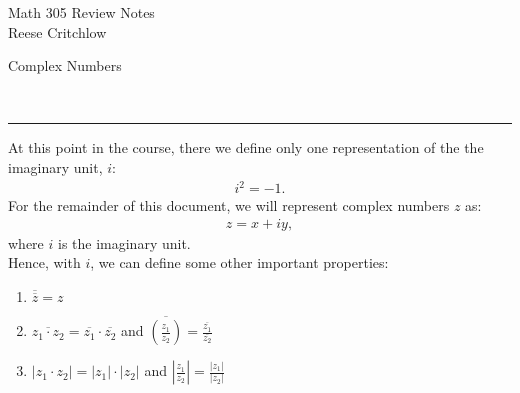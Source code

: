 \documentclass{article}
\newcommand{\header}[1]{\begin{large}\noindent #1\end{large}\\\rule{\textwidth}{0.5pt}}
\newcommand{\gap}{\medskip\\}
\newcommand{\ds}{\displaystyle}
\begin{document}
    \begin{center}
        \Large Math 305 Review Notes\\
        \normalsize Reese Critchlow
    \end{center}

    \header{Complex Numbers}

    At this point in the course, there we define only one representation of the 
    the imaginary unit, $i$:
    \begin{align*}
        i^2 = -1.
    \end{align*}
    For the remainder of this document, we will represent complex numbers $z$ as:
    \begin{align*}
        z = x + iy,
    \end{align*}
    where $i$ is the imaginary unit.
    \gap
    Hence, with $i$, we can define some other important properties:
    \begin{enumerate}
        \item $\ds \overline{\overline{z}} = z$
        \item $\ds \overline{z_1 \cdot z_2} = \overline{z_1}\cdot \overline{z_2}$ and
        $\ds \overline{\left(\frac{z_1}{z_2}\right)} = \frac{\overline{z_1}}{\overline{z_2}}$
        \item $\ds |z_1 \cdot z_2 | = |z_1| \cdot |z_2|$ and $\ds \left| \frac{z_1}{z_2} \right| = \frac{|z_1|}{|z_2|}$
    \end{enumerate}
\end{document}
